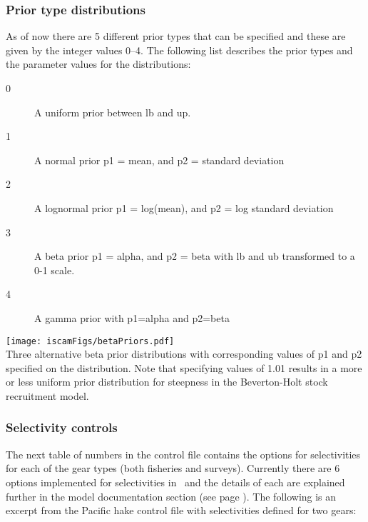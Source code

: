 \begin{multicols}{2}
\subsubsection{Prior type distributions}
As of now there are 5 different prior types that can be specified and these are given by the integer values 0--4.  The following list describes the prior types and the parameter values for the distributions:
\begin{description}
\item[0] A uniform prior between lb and up. 
\item[1] A normal prior p1 = mean, and p2 = standard deviation
\item[2] A lognormal prior p1 = log(mean), and p2 = log standard deviation
\item[3] A beta prior p1 = alpha, and p2 = beta with lb and ub transformed to a 0-1 scale.
\item[4] A gamma prior with p1=alpha and p2=beta
\end{description}

\begin{figurehere}
	\centering
	\texttt{[image: iscamFigs/betaPriors.pdf]}\\
	\caption{Three alternative beta prior distributions with corresponding values of p1 and p2 specified on the distribution.  Note that specifying values of 1.01 results in a more or less uniform prior distribution for steepness in the Beverton-Holt stock recruitment model.}\label{label}
\end{figurehere}

\subsubsection{Selectivity controls}
The next table of numbers in the control file contains the options for selectivities for each of the gear types (both fisheries and surveys).  Currently there are 6 options implemented for selectivities in \iscam\, and the details of each are explained further in the model documentation section (see page \pageref{ModelDocSelectivity}).  The following is an excerpt from the Pacific hake control file with selectivities defined for two gears:


\end{multicols}
